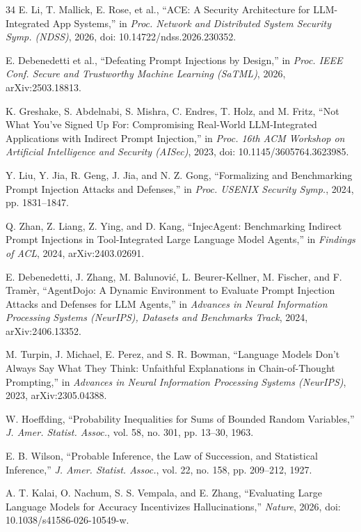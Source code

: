 \begin{thebibliography}{34}
E. Li, T. Mallick, E. Rose, et al., ``ACE: A Security Architecture for
LLM-Integrated App Systems,'' in \emph{Proc. Network and Distributed System
Security Symp. (NDSS)}, 2026, doi: 10.14722/ndss.2026.230352.

E. Debenedetti et al., ``Defeating Prompt Injections by Design,'' in
\emph{Proc. IEEE Conf. Secure and Trustworthy Machine Learning (SaTML)}, 2026,
arXiv:2503.18813.

K. Greshake, S. Abdelnabi, S. Mishra, C. Endres, T. Holz, and M. Fritz, ``Not
What You've Signed Up For: Compromising Real-World LLM-Integrated
Applications with Indirect Prompt Injection,'' in \emph{Proc. 16th ACM
Workshop on Artificial Intelligence and Security (AISec)}, 2023, doi:
10.1145/3605764.3623985.

Y. Liu, Y. Jia, R. Geng, J. Jia, and N. Z. Gong, ``Formalizing and
Benchmarking Prompt Injection Attacks and Defenses,'' in \emph{Proc. USENIX
Security Symp.}, 2024, pp. 1831--1847.

Q. Zhan, Z. Liang, Z. Ying, and D. Kang, ``InjecAgent: Benchmarking Indirect
Prompt Injections in Tool-Integrated Large Language Model Agents,'' in
\emph{Findings of ACL}, 2024, arXiv:2403.02691.

E. Debenedetti, J. Zhang, M. Balunovi{\'c}, L. Beurer-Kellner, M. Fischer,
and F. Tram{\`e}r, ``AgentDojo: A Dynamic Environment to Evaluate Prompt
Injection Attacks and Defenses for LLM Agents,'' in \emph{Advances in Neural
Information Processing Systems (NeurIPS), Datasets and Benchmarks Track},
2024, arXiv:2406.13352.

M. Turpin, J. Michael, E. Perez, and S. R. Bowman, ``Language Models Don't
Always Say What They Think: Unfaithful Explanations in Chain-of-Thought
Prompting,'' in \emph{Advances in Neural Information Processing Systems
(NeurIPS)}, 2023, arXiv:2305.04388.

W. Hoeffding, ``Probability Inequalities for Sums of Bounded Random
Variables,'' \emph{J. Amer. Statist. Assoc.}, vol. 58, no. 301, pp. 13--30,
1963.

E. B. Wilson, ``Probable Inference, the Law of Succession, and Statistical
Inference,'' \emph{J. Amer. Statist. Assoc.}, vol. 22, no. 158, pp. 209--212,
1927.

A. T. Kalai, O. Nachum, S. S. Vempala, and E. Zhang, ``Evaluating Large
Language Models for Accuracy Incentivizes Hallucinations,'' \emph{Nature},
2026, doi: 10.1038/s41586-026-10549-w.


\end{thebibliography}
